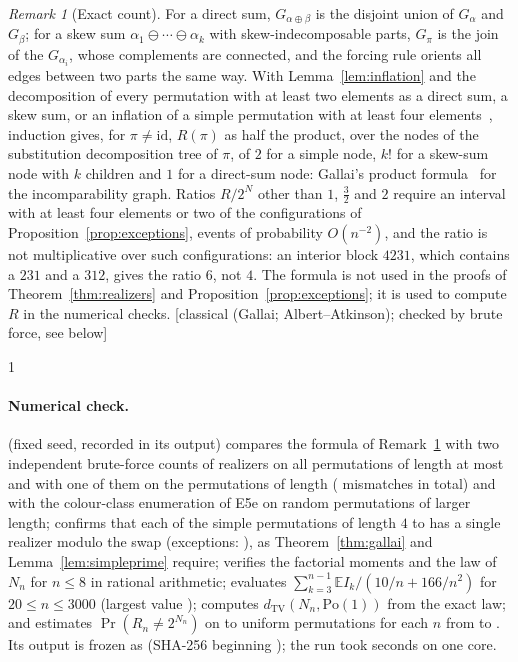 \documentclass[11pt,a4paper]{article}
\providecommand{\HasRlawChk}{0}
\theoremstyle{plain}
\theoremstyle{definition}
\theoremstyle{remark}
\newtheorem{remark}[theorem]{Remark}
\newcommand{\status}[1]{\textsf{\small [#1]}}
\begin{document}
\begin{remark}[Exact count]\label{rem:exact}
For a direct sum, $G_{\alpha\oplus\beta}$ is the disjoint union of $G_\alpha$ and $G_\beta$; for a skew sum $\alpha_1\ominus\cdots\ominus\alpha_k$ with skew-indecomposable parts, $G_\pi$ is the join of the $G_{\alpha_i}$, whose complements are connected, and the forcing rule orients all edges between two parts the same way. With Lemma~\ref{lem:inflation} and the decomposition of every permutation with at least two elements as a direct sum, a skew sum, or an inflation of a simple permutation with at least four elements~\citep{albert2005}, induction gives, for $\pi\ne\mathrm{id}$, $R(\pi)$ as half the product, over the nodes of the substitution decomposition tree of $\pi$, of $2$ for a simple node, $k!$ for a skew-sum node with $k$ children and $1$ for a direct-sum node: Gallai's product formula~\citep{gallai1967} for the incomparability graph. Ratios $R/2^N$ other than $1$, $\tfrac32$ and $2$ require an interval with at least four elements or two of the configurations of Proposition~\ref{prop:exceptions}, events of probability $O(n^{-2})$, and the ratio is not multiplicative over such configurations: an interior block $4231$, which contains a $231$ and a $312$, gives the ratio $6$, not $4$. The formula is not used in the proofs of Theorem~\ref{thm:realizers} and Proposition~\ref{prop:exceptions}; it is used to compute $R$ in the numerical checks. \status{classical (Gallai; Albert--Atkinson); checked by brute force, see below}
\end{remark}

\if\HasRlawChk1
\paragraph{Numerical check.}
 (fixed seed, recorded in its output) compares the formula of Remark~\ref{rem:exact} with two independent brute-force counts of realizers on all \RlawChkBruteTwoPerms{} permutations of length at most \RlawChkBruteTwoNmax{} and with one of them on the \RlawChkBruteOnePerms{} permutations of length \RlawChkBruteOneN{} (\RlawChkBruteMismatch{} mismatches in total) and with the colour-class enumeration of E5e on random permutations of larger length; confirms that each of the \RlawChkGallaiSimple{} simple permutations of length $4$ to \RlawChkGallaiNmax{} has a single realizer modulo the swap (exceptions: \RlawChkGallaiBad), as Theorem~\ref{thm:gallai} and Lemma~\ref{lem:simpleprime} require; verifies the factorial moments and the law of $N_n$ for $n\le8$ in rational arithmetic; evaluates $\sum_{k=3}^{n-1}\mathbb E I_k/(10/n+166/n^2)$ for $20\le n\le3000$ (largest value \RlawChkSnRatio); computes $d_{\mathrm{TV}}(N_n,\mathrm{Po}(1))$ from the exact law; and estimates $\Pr(R_n\ne2^{N_n})$ on \RlawChkSamplesMin{} to \RlawChkSamplesMax{} uniform permutations for each $n$ from \RlawChkNlo{} to \RlawChkNhi. Its output is frozen as  (SHA-256 beginning \texttt{\RlawChkSha}); the run took \RlawChkSeconds{} seconds on one core.
\fi
\end{document}
